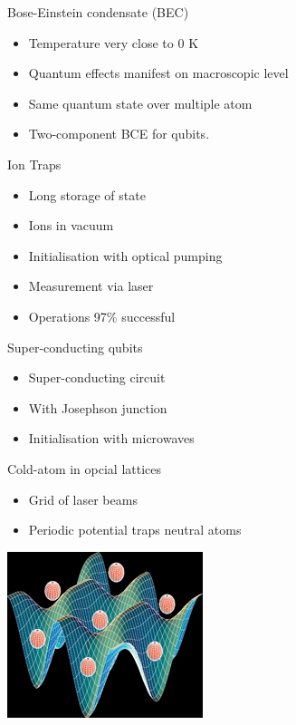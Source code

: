 \begin{frame}{Bose-Einstein condensate (BEC)}

\begin{itemize}
  \item Temperature very close to 0 K
  \item Quantum effects manifest on macroscopic level
  \item Same quantum state over multiple atom
  \item Two-component BCE for qubits.
\end{itemize}


\end{frame}

\begin{frame}{Ion Traps}

\begin{itemize}
	\item Long storage of state
    \item Ions in vacuum 
    \item Initialisation with optical pumping
    \item Measurement via laser
    \item Operations 97\% successful
\end{itemize}    
    
\end{frame}


\begin{frame}{Super-conducting qubits}

\begin{itemize}
 \item Super-conducting circuit
 \item With Josephson junction
 \item Initialisation with microwaves
 
\end{itemize}

\end{frame}

\begin{frame}{Cold-atom in opcial lattices}

\begin{itemize}
 \item Grid of laser beams
 \item Periodic potential traps neutral atoms

\end{itemize}

	\begin{center}
		\includegraphics[scale=0.8]{optlat.jpg}
	\end{center}


\end{frame}


